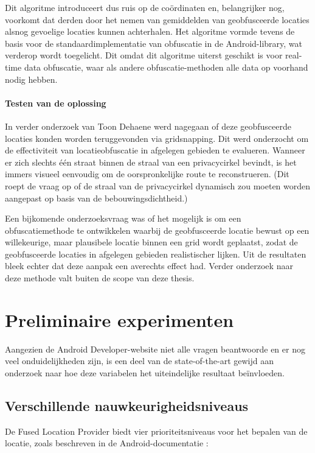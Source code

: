 Dit algoritme introduceert dus ruis op de coördinaten en, belangrijker nog, voorkomt dat derden door het nemen van gemiddelden van geobfusceerde locaties alsnog gevoelige locaties kunnen achterhalen. Het algoritme vormde tevens de basis voor de standaardimplementatie van obfuscatie in de Android-library, wat verderop wordt toegelicht. Dit omdat dit algoritme uiterst geschikt is voor real-time data obfuscatie, waar als andere obfuscatie-methoden alle data op voorhand nodig hebben.
\paragraph{Testen van de oplossing}
In verder onderzoek van Toon Dehaene werd nagegaan of deze geobfusceerde locaties konden worden teruggevonden via gridsnapping. 
Dit werd onderzocht om de effectiviteit van locatieobfuscatie in afgelegen gebieden te evalueren. Wanneer er zich slechts één straat binnen de straal van een privacycirkel bevindt, is het immers visueel eenvoudig om de oorspronkelijke route te reconstrueren. (Dit roept de vraag op of de straal van de privacycirkel dynamisch zou moeten worden aangepast op basis van de bebouwingsdichtheid.)

Een bijkomende onderzoeksvraag was of het mogelijk is om een obfuscatiemethode te ontwikkelen waarbij de geobfusceerde locatie bewust op een willekeurige, maar plausibele locatie binnen een grid wordt geplaatst, zodat de geobfusceerde locaties in afgelegen gebieden realistischer lijken. Uit de resultaten bleek echter dat deze aanpak een averechts effect had. Verder onderzoek naar deze methode valt buiten de scope van deze thesis.

\section{Preliminaire experimenten}
Aangezien de Android Developer-website niet alle vragen beantwoorde en er nog veel onduidelijkheden zijn, is een deel van de state-of-the-art gewijd aan onderzoek naar hoe deze variabelen het uiteindelijke resultaat beïnvloeden.
\subsection{Verschillende nauwkeurigheidsniveaus}
De Fused Location Provider biedt vier prioriteitsniveaus voor het bepalen van de locatie, zoals beschreven in de Android-documentatie \cite{location_battery}:

